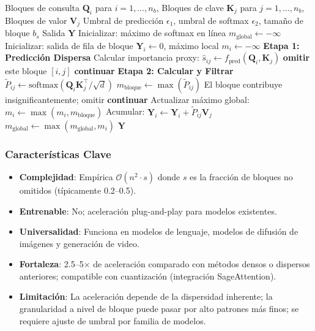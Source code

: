 \documentclass[11pt,a4paper]{article}
\begin{document}
\begin{algorithm}[H]
\caption{SpargeAttn: Filtrado Disperso de Dos Etapas por Bloques}
\begin{algorithmic}[1]
\Require Bloques de consulta $\mathbf{Q}_i$ para $i = 1, \ldots, n_b$, Bloques de clave $\mathbf{K}_j$ para $j = 1, \ldots, n_b$, Bloques de valor $\mathbf{V}_j$
\Require Umbral de predicción $\epsilon_1$, umbral de softmax $\epsilon_2$, tamaño de bloque $b_s$
\Ensure Salida $\mathbf{Y}$
\State Inicializar: máximo de softmax en línea $m_{\text{global}} \gets -\infty$
    \State Inicializar: salida de fila de bloque $\mathbf{Y}_i \gets 0$, máximo local $m_i \gets -\infty$
        \State \textbf{Etapa 1: Predicción Dispersa}
        \State Calcular importancia proxy: $\hat{s}_{ij} \gets f_{\text{pred}}(\mathbf{Q}_i, \mathbf{K}_j)$
            \State \textbf{omitir} este bloque $[i,j]$  
            \State \textbf{continuar} 
        \EndIf
        \State \textbf{Etapa 2: Calcular y Filtrar}
        \State $\tilde{P}_{ij} \gets \text{softmax}(\mathbf{Q}_i \mathbf{K}_j^\top / \sqrt{d})$
        \State $m_{\text{bloque}} \gets \max(\tilde{P}_{ij})$
            \State El bloque contribuye insignificantemente; omitir  
            \State \textbf{continuar}
        \EndIf
        \State Actualizar máximo global: $m_i \gets \max(m_i, m_{\text{bloque}})$
        \State Acumular: $\mathbf{Y}_i \gets \mathbf{Y}_i + \tilde{P}_{ij} \mathbf{V}_j$
    \EndFor
    \State $m_{\text{global}} \gets \max(m_{\text{global}}, m_i)$
\EndFor
\Return $\mathbf{Y}$
\end{algorithmic}
\end{algorithm}

\subsubsection{Características Clave}

\begin{itemize}[leftmargin=*]
    \item \textbf{Complejidad}: Empírica $\mathcal{O}(n^2 \cdot s)$ donde $s$ es la fracción de bloques no omitidos (típicamente 0.2--0.5).
    \item \textbf{Entrenable}: No; aceleración plug-and-play para modelos existentes.
    \item \textbf{Universalidad}: Funciona en modelos de lenguaje, modelos de difusión de imágenes y generación de video.
    \item \textbf{Fortaleza}: 2.5--5$\times$ de aceleración comparado con métodos densos o dispersos anteriores; compatible con cuantización (integración SageAttention).
    \item \textbf{Limitación}: La aceleración depende de la dispersidad inherente; la granularidad a nivel de bloque puede pasar por alto patrones más finos; se requiere ajuste de umbral por familia de modelos.
\end{itemize}
\end{document}
